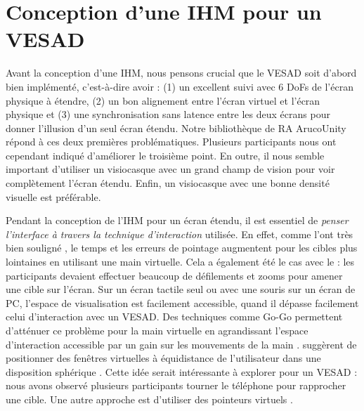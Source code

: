 \section{Conception d'une IHM pour un VESAD}
\label{sec:discussion_design}

Avant la conception d'une IHM, nous pensons crucial que le VESAD soit d'abord bien implémenté, c'est-à-dire avoir : (1) un excellent suivi avec 6 DoFs de l'écran physique à étendre, (2) un bon alignement entre l'écran virtuel et l'écran physique et (3) une synchronisation sans latence entre les deux écrans pour donner l'illusion d'un seul écran étendu. Notre bibliothèque de RA ArucoUnity répond à ces deux premières problématiques. Plusieurs participants nous ont cependant indiqué d'améliorer le troisième point. En outre, il nous semble important d'utiliser un visiocasque avec un grand champ de vision pour voir complètement l'écran étendu. Enfin, un visiocasque avec une bonne densité visuelle est préférable.


Pendant la conception de l'IHM pour un écran étendu, il est essentiel de \emph{penser l'interface à travers la technique d'interaction} utilisée. En effet, comme l'ont très bien souligné \cite{Ens2014}, le temps et les erreurs de pointage augmentent pour les cibles plus lointaines en utilisant une main virtuelle. Cela a également été le cas avec le  : les participants devaient effectuer beaucoup de défilements et zooms pour amener une cible sur l'écran. Sur un écran tactile seul ou avec une souris sur un écran de PC, l'espace de visualisation est facilement accessible, quand il dépasse facilement celui d'interaction avec un VESAD. Des techniques comme Go-Go permettent d'atténuer ce problème pour la main virtuelle en agrandissant l'espace d'interaction accessible par un gain sur les mouvements de la main . \citeauthor{Ens2014} suggèrent de positionner des fenêtres virtuelles à équidistance de l'utilisateur dans une disposition sphérique . Cette idée serait intéressante à explorer pour un VESAD : nous avons observé plusieurs participants tourner le téléphone pour rapprocher une cible. Une autre approche est d'utiliser des pointeurs virtuels \citep{Argelaguet2013}.

